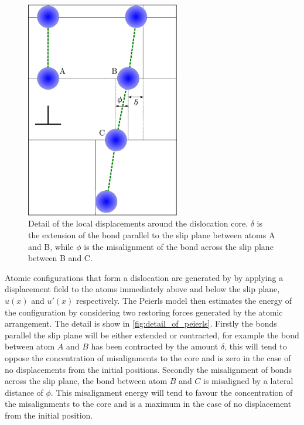 \begin{figure}
\centering
\includegraphics[width=0.6\textwidth]{peierls_model_detail}

\caption{Detail of the local displacements around the dislocation core. $\delta$ is the extension of the bond parallel to the slip plane between atoms A and B, while $\phi$ is the misalignment of the bond across the slip plane between B and C.\label{fig:detail_of_peierls}}
\end{figure}

Atomic configurations that form a dislocation are generated by by applying a displacement field to the atoms immediately above and below the slip plane, $u(x)$ and $u'(x)$ respectively. The Peierls model then estimates the energy of the configuration by considering two restoring forces generated by the atomic arrangement. The detail is show in \autoref{fig:detail_of_peierls}. Firstly the bonds parallel the slip plane will be either extended or contracted, for example the bond between atom $A$ and $B$ has been contracted by the amount $\delta$, this will tend to oppose the concentration of misalignments to the core and is zero in the case of no displacements from the initial positions. Secondly the misalignment of bonds across the slip plane, the bond between atom $B$ and $C$ is misaligned by a lateral distance of $\phi$. This misalignment energy will tend to favour the concentration of the misalignments to the core and is a maximum in the case of no displacement from the initial position.

